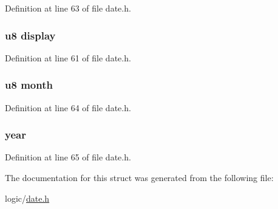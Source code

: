 \-Definition at line 63 of file date.\-h.

\hypertarget{structdate_a38f8f410104c7551db27a14196c8e15c}{
\subsubsection[{display}]{\setlength{\rightskip}{0pt plus 5cm}u8 {\bf display}}}\label{structdate_a38f8f410104c7551db27a14196c8e15c}


\-Definition at line 61 of file date.\-h.

\hypertarget{structdate_ad5f8cd6773aef677b920ae4e4265bb10}{
\subsubsection[{month}]{\setlength{\rightskip}{0pt plus 5cm}u8 {\bf month}}}\label{structdate_ad5f8cd6773aef677b920ae4e4265bb10}


\-Definition at line 64 of file date.\-h.

\hypertarget{structdate_a5f976764bc633de731704ebdaf334b0b}{
\subsubsection[{year}]{ {\bf year}}}\label{structdate_a5f976764bc633de731704ebdaf334b0b}


\-Definition at line 65 of file date.\-h.



\-The documentation for this struct was generated from the following file\-:\begin{DoxyCompactItemize}
\item 
logic/\hyperlink{date_8h}{date.\-h}\end{DoxyCompactItemize}
